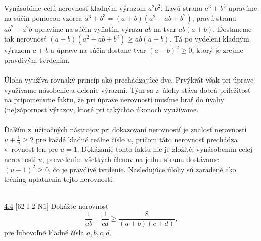 \rie Vynásobíme celú nerovnosť kladným výrazom $a^2b^2$. Ľavú stranu $a^3+b^3$ upravíme na súčin pomocou vzorca $a^3+b^3=(a+b)(a^2-ab+b^2)$, pravú stranu $ab^2+a^2b$ upravíme na súčin vyňatím výrazu $ab$ na tvar $ab(a+b)$. Dostaneme tak nerovnosť $(a+b)(a^2-ab+b^2)\geq ab(a+b)$. Tá po vydelení kladným výrazom  $a + b$ a úprave na súčin dostane tvar $(a - b)^2\geq 0$, ktorý je zrejme pravdivým tvrdením. \\
\\
\kom Úloha využíva rovnaký princíp ako prechádzajúce dve. Prvýkrát však pri úprave využívame násobenie a delenie výrazmi. Tým sa z~úlohy stáva dobrá príležitosť na pripomenutie faktu, že pri úprave nerovností musíme brať do úvahy (ne)zápornosť výrazov, ktoré pri takýchto úkonoch využívame.\\
\\
\kom Ďalším z~užitočných nástrojov pri dokazovaní nerovností je znalosť nerovnosti $u+\frac{1}{u}\geq 2$ pre každé kladné reálne číslo $u$, pričom táto nerovnosť prechádza v~rovnosť len pre $u=1$. Dokázanie tohto faktu nie je zložité: vynásobením celej nerovnosti $u$, prevedením všetkých členov na jednu stranu dostávame $(u-1)^2\geq 0$, čo je pravdivé tvrdenie. Nasledujúce úlohy sú zaradené ako tréning uplatnenia tejto nerovnosti.\\
\\
\begin{tcolorbox}[breakable,notitle,boxrule=0pt,colback=light-gray,colframe=light-gray]\ul{4.4} [62-I-2-N1] Dokážte nerovnosť $$\frac{1}{ab}+\frac{1}{cd}\geq \frac{8}{(a+b)(c+d)},$$ pre ľubovoľné kladné čísla $a, b, c, d$.

\end{tcolorbox}

